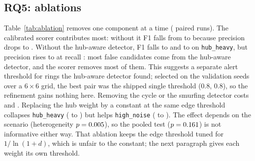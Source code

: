 \subsection{RQ5: ablations}

Table~\ref{tab:ablation} removes one component at a time (\AblPairs{} paired
runs). The calibrated scorer contributes most: without it F1 falls from
\AblFullF{} to \AblNoScoringF{} because precision drops to \AblNoScoringP{}.
Without the hub-aware detector, F1 falls to \AblNoHubAwareF{} and to
\AblNoHubAwareFHubHeavy{} on \texttt{hub\_heavy}, but precision rises to
\AblNoHubAwareP{} at recall \AblNoHubAwareR{}: most false candidates come from
the hub-aware detector, and the scorer removes most of them. This suggests a
separate alert threshold for rings the hub-aware detector found; selected on
the validation seeds over a $6\times6$ grid, the best pair was the shipped
single threshold (0.8, 0.8), so the refinement gains nothing here. Removing the cycle or the
smurfing detector costs \AblNoCycleF{} and \AblNoSmurfingF{}. Replacing the hub
weight by a constant at the same edge threshold collapses \texttt{hub\_heavy}
(\AblFullFHubHeavy{} to \AblNoHubWeightFHubHeavy{}) but helps
\texttt{high\_noise} (\AblFullFHighNoise{} to \AblNoHubWeightFHighNoise{}). The
effect depends on the scenario (heterogeneity $p=0.005$), so the pooled
test ($p=0.161{}$) is not informative either way. That ablation keeps the edge threshold tuned for
$1/\ln(1+d)$, which is unfair to the constant; the next paragraph gives each
weight its own threshold.

